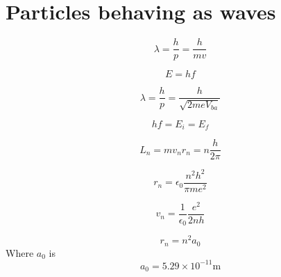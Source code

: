 \documentclass[nobib,notoc]{tufte-handout}
\begin{document}
\section{Particles behaving as waves}
\begin{defi}
	\begin{equation*}
		\lambda=\frac{h}{p}=\frac{h}{mv}
	\end{equation*}
\end{defi}
\begin{defi}
	\begin{equation*}
		E=hf
	\end{equation*}
\end{defi}
\begin{defi}
	\begin{equation*}
		\lambda=\frac{h}{p}=\frac{h}{\sqrt{2meV_{ba}}}
	\end{equation*}
\end{defi}
\begin{defi}
	\begin{equation*}
		hf=E_i=E_f
	\end{equation*}
\end{defi}
\begin{defi}
	\begin{equation*}
		L_n=mv_nr_n=n\frac{h}{2\pi}
	\end{equation*}
\end{defi}
\begin{defi}
	\begin{equation*}
		r_n=\epsilon_0\frac{n^2 h^2}{\pi me^2}
	\end{equation*}
\end{defi}
\begin{defi}
	\begin{equation*}
		v_n=\frac{1}{\epsilon_0}\frac{e^2}{2nh}
	\end{equation*}
\end{defi}
\begin{defi}
	\begin{equation*}
		r_n=n^2a_0
	\end{equation*}
	Where \(a_0\) is
	\begin{equation*}
		a_0=5.29\times 10^{-11}\text{m}
	\end{equation*}
\end{defi}
\end{document}
